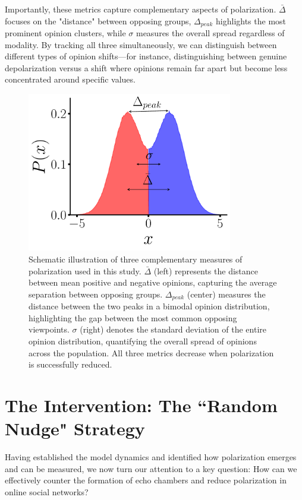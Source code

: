 Importantly, these metrics capture complementary aspects of polarization. $\bar \Delta$ focuses on the "distance" between opposing groups, $\Delta_{peak}$ highlights the most prominent opinion clusters, while $\sigma$ measures the overall spread regardless of modality. By tracking all three simultaneously, we can distinguish between different types of opinion shifts—for instance, distinguishing between genuine depolarization versus a shift where opinions remain far apart but become less concentrated around specific values.
\begin{figure}[H]
    \centering
    \includegraphics[width=0.8\textwidth]{chapters/chapter2/polarization_definition.pdf}
    \caption{Schematic illustration of three complementary measures of polarization used in this study. \textbf{$\bar \Delta$} (left) represents the distance between mean positive and negative opinions, capturing the average separation between opposing groups. \textbf{$\Delta_{peak}$} (center) measures the distance between the two peaks in a bimodal opinion distribution, highlighting the gap between the most common opposing viewpoints. \textbf{$\sigma$} (right) denotes the standard deviation of the entire opinion distribution, quantifying the overall spread of opinions across the population. All three metrics decrease when polarization is successfully reduced.}
    \label{fig:pol_def}
\end{figure}
\section{The Intervention: The ``Random Nudge" Strategy}
\label{sec:random_nudge}
Having established the model dynamics and identified how polarization emerges and can be measured, we now turn our attention to a key question: How can we effectively counter the formation of echo chambers and reduce polarization in online social networks?

